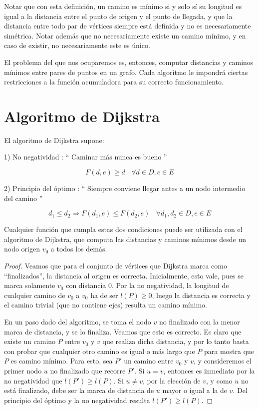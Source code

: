 \documentclass{article}
\begin{document}
Notar que con esta definición, un camino es mínimo si y solo sí su longitud es igual a la distancia entre el punto
de origen y el punto de llegada, y que la distancia entre todo par de vértices siempre está definida y no es
necesariamente simétrica. Notar además que no necesariamente existe un camino mínimo, y en caso de existir, no
necesariamente este es único.

El problema del que nos ocuparemos es, entonces, computar distancias y caminos mínimos entre pares de puntos en un grafo. Cada
algoritmo le impondrá ciertas restricciones a la función acumuladora para su correcto funcionamiento.

\section{Algoritmo de Dijkstra}

El algoritmo de Dijkstra supone:

1) No negatividad : `` Caminar más nunca es bueno ''

$$F(d,e) \geq d \ \ \ \  \forall d \in D, e \in E$$

2) Principio del óptimo : `` Siempre conviene llegar antes a un nodo intermedio del camino ''

$$d_1 \leq d_2 \Rightarrow F(d_1,e) \leq F(d_2,e) \ \ \ \  \forall d_1,d_2 \in D, e \in E$$

Cualquier función que cumpla estas dos condiciones puede ser utilizada con el algoritmo de Dijkstra, que
computa las distancias y caminos mínimos desde un nodo origen $v_0$ a todos los demás.

\begin{proof}

Veamos que para el conjunto de vértices que Dijkstra marca como ``finalizados'', la distancia al origen es correcta.
Inicialmente, esto vale, pues se marca solamente $v_0$ con distancia $0$. Por la no negatividad, la
longitud de cualquier camino de $v_0$ a $v_0$ ha de ser $l(P) \geq 0$, luego la distancia es correcta y el camino trivial (que
no contiene ejes) resulta un camino mínimo.

En un paso dado del algoritmo, se toma el nodo $v$ no finalizado con la menor marca de distancia, y se lo finaliza. Veamos
que esto es correcto. Es claro que existe un camino $P$ entre $v_0$ y $v$ que realiza dicha distancia, y por lo tanto basta con probar
que cualquier otro camino es igual o más largo que $P$ para mostra que $P$ es camino mínimo. Para esto, sea $P'$ un camino
entre $v_0$ y $v$, y consideremos el primer nodo $u$ no finalizado que recorre $P'$. Si $u=v$, entonces es
inmediato por la no negatividad que $l(P') \geq l(P)$. Si $u \neq v$, por la elección de $v$, y como $u$ no está
finalizado, debe ser la marca de distancia de $u$ mayor o igual a la de $v$. Del principio del óptimo y la no
negatividad resulta $l(P') \geq l(P)$.

\end{proof}
\end{document}
